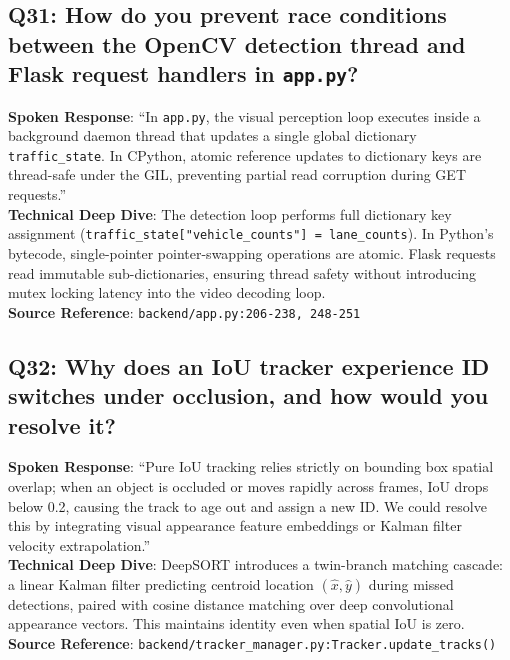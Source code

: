 \subsection*{Q31: How do you prevent race conditions between the OpenCV detection thread and Flask request handlers in \texttt{app.py}?}
\begin{interviewbox}
\textbf{Spoken Response}: ``In \texttt{app.py}, the visual perception loop executes inside a background daemon thread that updates a single global dictionary \texttt{traffic\_state}. In CPython, atomic reference updates to dictionary keys are thread-safe under the GIL, preventing partial read corruption during GET requests.''\\
\textbf{Technical Deep Dive}: The detection loop performs full dictionary key assignment (\texttt{traffic\_state["vehicle\_counts"] = lane\_counts}). In Python's bytecode, single-pointer pointer-swapping operations are atomic. Flask requests read immutable sub-dictionaries, ensuring thread safety without introducing mutex locking latency into the video decoding loop.\\
\textbf{Source Reference}: \texttt{backend/app.py:206-238, 248-251}
\end{interviewbox}

\subsection*{Q32: Why does an IoU tracker experience ID switches under occlusion, and how would you resolve it?}
\begin{interviewbox}
\textbf{Spoken Response}: ``Pure IoU tracking relies strictly on bounding box spatial overlap; when an object is occluded or moves rapidly across frames, IoU drops below 0.2, causing the track to age out and assign a new ID. We could resolve this by integrating visual appearance feature embeddings or Kalman filter velocity extrapolation.''\\
\textbf{Technical Deep Dive}: DeepSORT introduces a twin-branch matching cascade: a linear Kalman filter predicting centroid location $(\hat{x}, \hat{y})$ during missed detections, paired with cosine distance matching over deep convolutional appearance vectors. This maintains identity even when spatial IoU is zero.\\
\textbf{Source Reference}: \texttt{backend/tracker\_manager.py:Tracker.update\_tracks()}
\end{interviewbox}

